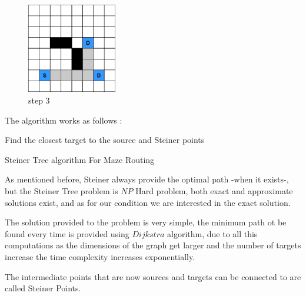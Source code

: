     \begin{figure}[H]
        \centering
        \includegraphics[width=0.35\textwidth]{figures/Steiner Stages/steiner_3.png}
        \caption{step 3}
        \label{fig:steiner_3}
    \end{figure}

    The algorithm works as follows \cite{SteinerRef}:
    \newline
    
    \begin{algorithm}[h!]
        \SetAlgoLined
        Find the closest target to the source and Steiner points\;
         \caption{Steiner Tree algorithm For Maze Routing}
    \end{algorithm}
        
    As mentioned before, Steiner always provide the optimal path -when it exists-,
    but the Steiner Tree problem is $NP$ Hard problem, both exact and approximate solutions exist,
    and as for our condition we are interested in the exact solution.

    The solution provided to the problem is very simple, the minimum path ot be found 
    every time is provided using $Dijkstra$ algorithm, due to all this computations as the dimensions of the graph get larger and the number
    of targets increase the time complexity increases exponentially.

    The intermediate points that are now sources and targets can be connected to are called
    Steiner Points.